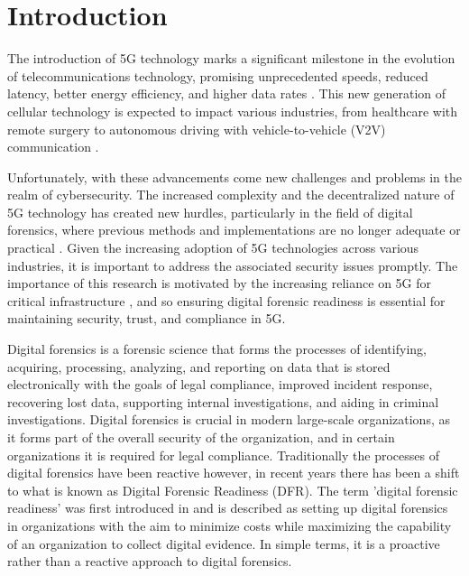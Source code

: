 \documentclass[final,1p,times,authoryear]{elsarticle}
\begin{document}


\section{Introduction}
\label{sec1}
The introduction of 5G technology marks a significant milestone in the evolution of telecommunications technology, promising unprecedented speeds, reduced latency, better energy efficiency, and higher data rates \citep{hajlaoui20204g}. This new generation of cellular technology is expected to impact various industries, from healthcare with remote surgery to autonomous driving with vehicle-to-vehicle (V2V) communication \citep{dangi2021study}.

\vspace{1em}

Unfortunately, with these advancements come new challenges and problems in the realm of cybersecurity. The increased complexity and the decentralized nature of 5G technology has created new hurdles, particularly in the field of digital forensics, where previous methods and implementations are no longer adequate or practical \citep{sharevski2018towards}. Given the increasing adoption of 5G technologies across various industries, it is important to address the associated security issues promptly. The importance of this research is motivated by the increasing reliance on 5G for critical infrastructure \citep{jover2019current}, and so ensuring digital forensic readiness is essential for maintaining security, trust, and compliance in 5G.

\vspace{1em}

Digital forensics is a forensic science that forms the processes of identifying, acquiring, processing, analyzing, and reporting on data that is stored electronically with the goals of legal compliance, improved incident response, recovering lost data, supporting internal investigations, and aiding in criminal investigations. Digital forensics is crucial in modern large-scale organizations, as it forms part of the overall security of the organization, and in certain organizations it is required for legal compliance. Traditionally the processes of digital forensics have been reactive however, in recent years there has been a shift to what is known as Digital Forensic Readiness (DFR). The term 'digital forensic readiness' was first introduced in \citep{tan2001forensic} and is described as setting up digital forensics in organizations with the aim to minimize costs while maximizing the capability of an organization to collect digital evidence. In simple terms, it is a proactive rather than a reactive approach to digital forensics.
\end{document}
